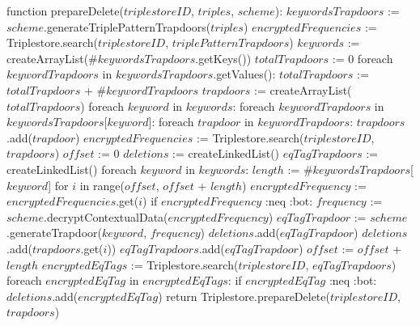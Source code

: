 function prepareDelete($triplestoreID$, $triples$, $scheme$):
    $keywordsTrapdoors$ := $scheme$.generateTriplePatternTrapdoors($triples$)
    $encryptedFrequencies$ := Triplestore.search($triplestoreID$, $triplePatternTrapdoors$)
    $keywords$ := createArrayList($\#keywordsTrapdoors$.getKeys())
    $totalTrapdoors$ := 0
    foreach $keywordTrapdoors$ in $keywordsTrapdoors$.getValues():
        $totalTrapdoors$ := $totalTrapdoors$ + $\#keywordTrapdoors$
    $trapdoors$ := createArrayList($totalTrapdoors$)
    foreach $keyword$ in $keywords$:
        foreach $keywordTrapdoors$ in $keywordsTrapdoors$[$keyword$]:
            foreach $trapdoor$ in $keywordTrapdoors$:
                $trapdoors$.add($trapdoor$)
    $encryptedFrequencies$ := Triplestore.search($triplestoreID$, $trapdoors$)
    $offset$ := 0
    $deletions$ := createLinkedList()
    $eqTagTrapdoors$ := createLinkedList()
    foreach $keyword$ in $keywords$:
        $length$ := $\#keywordsTrapdoors$[$keyword$]
        for $i$ in range($offset$, $offset$ + $length$) 
            $encryptedFrequency$ := $encryptedFrequencies$.get($i$)
            if $encryptedFrequency$ :neq :bot:
                $frequency$ := $scheme$.decryptContextualData($encryptedFrequency$)
                $eqTagTrapdoor$ := $scheme$.generateTrapdoor($keyword$, $frequency$)
                $deletions$.add($eqTagTrapdoor$)
                $deletions$.add($trapdoors$.get($i$))
                $eqTagTrapdoors$.add($eqTagTrapdoor$)
        $offset$ := $offset$ + $length$
    $encryptedEqTags$ := Triplestore.search($triplestoreID$, $eqTagTrapdoors$)
    foreach $encryptedEqTag$ in $encryptedEqTags$:
        if $encryptedEqTag$ :neq :bot:
            $deletions$.add($encryptedEqTag$)
    return Triplestore.prepareDelete($triplestoreID$, $trapdoors$)